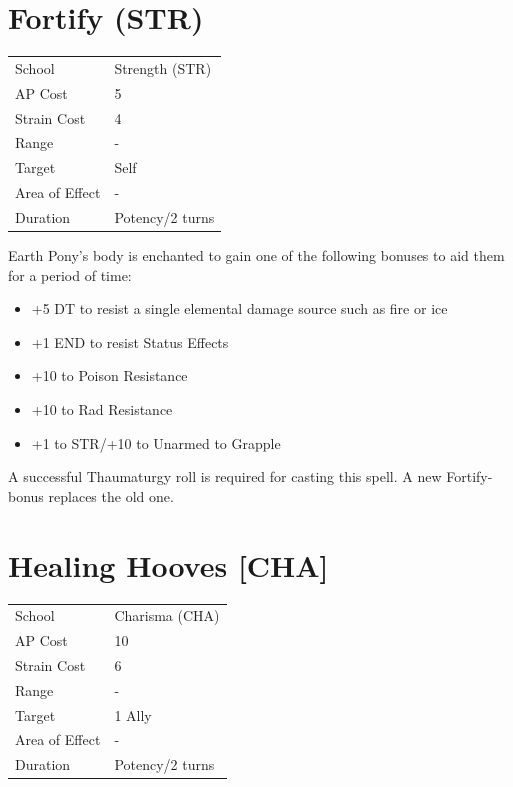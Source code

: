 \documentclass[11pt,a4paper,twocolumn]{book}
\begin{document}
\section*{Fortify (STR)}
{
	\begin{tabu} to 75mm{| X[l,4] | X[l,7] |}
		\hline
		School 			& Strength (STR) 	\\
        AP Cost	      	& 5 				\\
        Strain Cost     & 4 				\\
        Range     		& - 				\\
        Target      	& Self 				\\
        Area of Effect  & - 	 			\\
        Duration     	& Potency/2 turns 	\\ \hline
	\end{tabu}
		
}

\medskip

Earth Pony's body is enchanted to gain one of the following bonuses to aid them for a period of time:
\begin{itemize}
  \item +5 DT to resist a single elemental damage source such as fire or ice
  \item +1 END to resist Status Effects
  \item +10 to Poison Resistance
  \item +10 to Rad Resistance
  \item +1 to STR/+10 to Unarmed to Grapple
\end{itemize}
	
A successful Thaumaturgy roll is required for casting this spell. A new Fortify-bonus replaces the old one.


\section*{Healing Hooves [CHA]}
{
	\begin{tabu} to 75mm{| X[l,4] | X[l,7] |}
		\hline
		School 			& Charisma (CHA) 	\\
        AP Cost	      	& 10 				\\
        Strain Cost     & 6 				\\
        Range     		& - 				\\
        Target      	& 1 Ally 			\\
        Area of Effect  & - 	 			\\
        Duration     	& Potency/2 turns 	\\ \hline
	\end{tabu}
		
}
\end{document}
